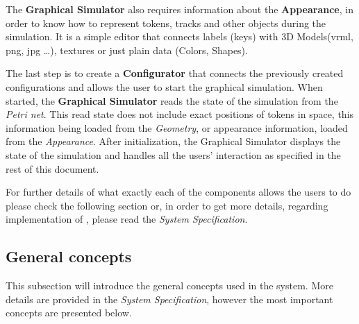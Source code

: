 The \textbf{Graphical Simulator} also requires information about the \textbf{Appearance}, in order
to know how to represent tokens, tracks and other objects during the simulation. It is a simple
editor that connects labels (keys) with 3D Models(vrml, png, jpg \ldots), textures or just plain
data (Colors, Shapes).
  
The last step is to create a \textbf{Configurator} that connects the previously created
configurations and allows the user to start the graphical simulation. When started, the
\textbf{Graphical Simulator} reads the state of the simulation from the \textit{Petri net}. This read
state does not include exact positions of tokens in space, this information being loaded from the
\textit{Geometry}, or appearance information, loaded from the \textit{Appearance}. After
initialization, the Graphical Simulator displays the state of the simulation and handles all the
users' interaction as specified in the rest of this document.

For further details of what exactly each of the components allows the users to do please check the
following section or, in order to get more details, regarding implementation of \epns, please read the
\textit{System Specification}.

\subsection{General concepts}
\label{oa:generalconcepts}
This subsection will introduce the general concepts used in the \epns system. More details are
provided in the \textit{System Specification}, however the most important concepts are presented below.

